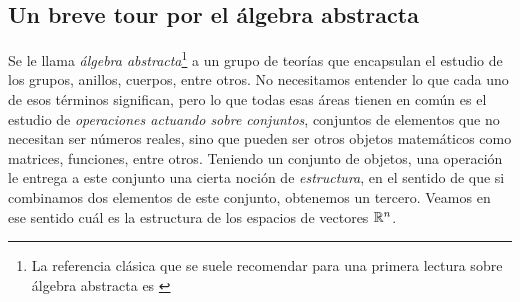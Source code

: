 \subsection{Un breve tour por el álgebra abstracta}

Se le llama \textit{álgebra abstracta}\footnote{La referencia clásica que se suele recomendar para una primera lectura sobre álgebra abstracta es \cite{dummit2003abstract}} a un grupo de teorías que encapsulan el estudio de los grupos, anillos, cuerpos, entre otros. No necesitamos entender lo que cada uno de esos términos significan, pero lo que todas esas áreas tienen en común es el estudio de \textit{operaciones actuando sobre conjuntos}, conjuntos de elementos que no necesitan ser números reales, sino que pueden ser otros objetos matemáticos como matrices, funciones, entre otros. Teniendo un conjunto de objetos, una operación le entrega a este conjunto una cierta noción de \textit{estructura}, en el sentido de que si combinamos dos elementos de este conjunto, obtenemos un tercero. Veamos en ese sentido cuál es la estructura de los espacios de vectores $\mathbb{R}^n$.

